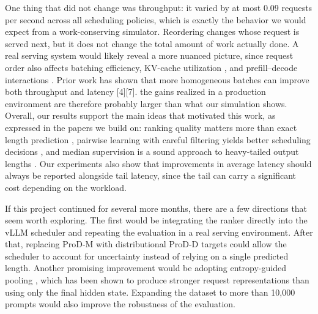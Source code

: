 \documentclass[conference]{IEEEtran}
\begin{document}
One thing that did not change was throughput: it varied by at most 0.09 requests per second across all scheduling policies, which is exactly the behavior we would expect from a work-conserving simulator. Reordering changes whose request is served next, but it does not change the total amount of work actually done. A real serving system would likely reveal a more nuanced picture, since request order also affects batching efficiency, KV-cache utilization \cite{kwon2023pagedattention}, and prefill--decode interactions \cite{agrawal2024sarathi}. Prior work has shown that more homogeneous batches can improve both throughput and latency [4][7]. the gains realized in a production environment are therefore probably larger than what our simulation shows.
Overall, our results support the main ideas that motivated this work, as expressed in the papers we build on: ranking quality matters more than exact length prediction \cite{fu2024efficient}, pairwise learning with careful filtering yields better scheduling decisions \cite{tao2025pars}, and median supervision is a sound approach to heavy-tailed output lengths \cite{wang2026prodm}. Our experiments also show that improvements in average latency should always be reported alongside tail latency, since the tail can carry a significant cost depending on the workload.

If this project continued for several more months, there are a few directions that seem worth exploring. The first would be integrating the ranker directly into the vLLM scheduler and repeating the evaluation in a real serving environment. After that, replacing ProD-M with distributional ProD-D targets could allow the scheduler to account for uncertainty instead of relying on a single predicted length. Another promising improvement would be adopting entropy-guided pooling \cite{xie2026egtp}, which has been shown to produce stronger request representations than using only the final hidden state. Expanding the dataset to more than 10{,}000 prompts would also improve the robustness of the evaluation. 
\end{document}

